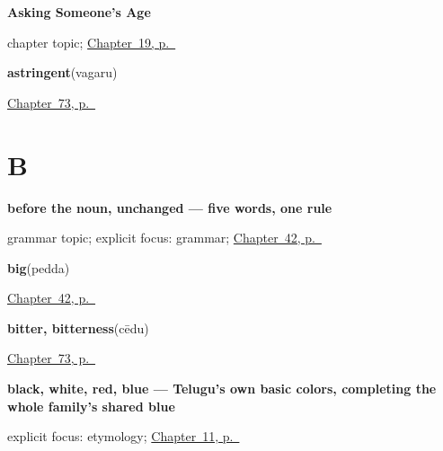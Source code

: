 \noindent\begin{minipage}[t]{\linewidth}
\raggedright
\textbf{Asking Someone's Age}\par
\footnotesize chapter topic; \hyperref[ch:te-asking-age]{Chapter~19, p.~\pageref*{ch:te-asking-age}}
\end{minipage}\par\smallskip

\noindent\begin{minipage}[t]{\linewidth}
\raggedright
\textbf{astringent}\enspace\emph{}\enspace(vagaru)\par
\footnotesize \hyperref[ch:te-tastes]{Chapter~73, p.~\pageref*{ch:te-tastes}}
\end{minipage}\par\smallskip

\section*{B}

\noindent\begin{minipage}[t]{\linewidth}
\raggedright
\textbf{before the noun, unchanged — five words, one rule}\par
\footnotesize grammar topic; explicit focus: grammar; \hyperref[ch:te-describing-things]{Chapter~42, p.~\pageref*{ch:te-describing-things}}
\end{minipage}\par\smallskip

\noindent\begin{minipage}[t]{\linewidth}
\raggedright
\textbf{big}\enspace\emph{}\enspace(pedda)\par
\footnotesize \hyperref[ch:te-describing-things]{Chapter~42, p.~\pageref*{ch:te-describing-things}}
\end{minipage}\par\smallskip

\noindent\begin{minipage}[t]{\linewidth}
\raggedright
\textbf{bitter, bitterness}\enspace\emph{}\enspace(cēdu)\par
\footnotesize \hyperref[ch:te-tastes]{Chapter~73, p.~\pageref*{ch:te-tastes}}
\end{minipage}\par\smallskip

\noindent\begin{minipage}[t]{\linewidth}
\raggedright
\textbf{black, white, red, blue — Telugu's own basic colors, completing the whole family's shared blue}\enspace\emph{   }\par
\footnotesize explicit focus: etymology; \hyperref[ch:te-core-colours]{Chapter~11, p.~\pageref*{ch:te-core-colours}}
\end{minipage}\par\smallskip

